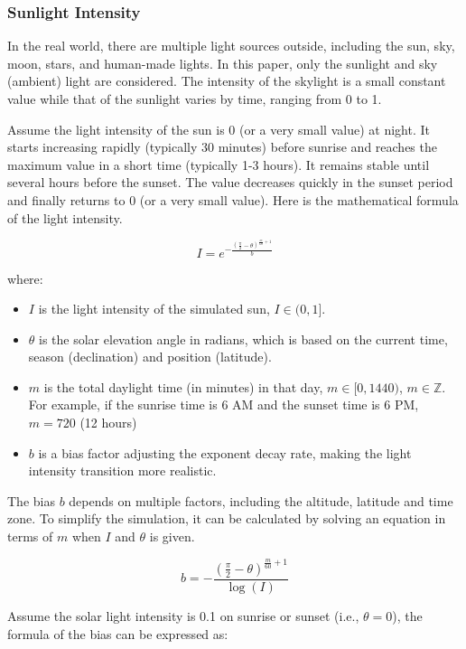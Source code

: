 \documentclass{article}
\begin{document}
\begin{itemize}
\subsubsection {Sunlight Intensity}
In the real world, there are multiple light sources outside, including the sun, sky, moon, stars, 
and human-made lights. In this paper, only the sunlight and sky (ambient) light are considered. 
The intensity of the skylight is a small constant value while that of the sunlight varies by 
time, ranging from 0 to 1.

Assume the light intensity of the sun is 0 (or a very small value) at night. It starts increasing 
rapidly (typically 30 minutes) before sunrise and reaches the maximum value in a short time 
(typically 1-3 hours). It remains stable until several hours before the sunset. The value 
decreases quickly in the sunset period and finally returns to 0 (or a very small value). Here is 
the mathematical formula of the light intensity.

\[
  I = e^{-\frac{\left(\frac{\pi}{2} - \theta\right)^{\frac{m}{60} + 1}}{b}}
\]

where:
\begin{itemize}
  \item \( I \) is the light intensity of the simulated sun, \( I \in (0, 1] \).
  \item \( \theta \) is the solar elevation angle in radians, which is based on the current time, 
  season (declination) and position (latitude).
  \item \( m \) is the total daylight time (in minutes) in that day, \( m \in [0, 1440) \), \( m \in \mathbb{Z} \). 
  For example, if the sunrise time is 6 AM and the sunset time is 6 PM, \( m=720 \) (12 hours)
  \item \( b \) is a bias factor adjusting the exponent decay rate, making the light intensity
  transition more realistic.
\end{itemize}

The bias \( b \) depends on multiple factors, including the altitude, latitude and time zone. To
simplify the simulation, it can be calculated by solving an equation in terms of \( m \) when 
\( I \) and \( \theta\) is given.

\[
  b = -\frac{\left(\frac{\pi}{2} - \theta\right)^{\frac{m}{60} + 1}}{\log(I)}
\]

Assume the solar light intensity is 0.1 on sunrise or sunset (i.e., \( \theta=0\)), the formula 
of the bias can be expressed as:


\end{itemize}
\end{document}
